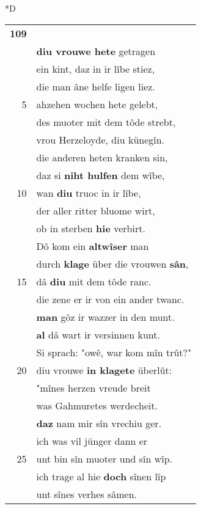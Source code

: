\documentclass[8pt,a4paper,notitlepage]{article}
\begin{document}
\begin{table}[ht]
\begin{minipage}[t]{0.5\linewidth}
\small
\begin{center}*D
\end{center}
\begin{tabular}{rl}
\textbf{109} & \textbf{\begin{large}D\end{large}ie} muosen wol von \textbf{schulden} klagen.\\ 
 & \textbf{diu vrouwe hete} getragen\\ 
 & ein kint, daz in ir lîbe stiez,\\ 
 & die man âne helfe ligen liez.\\ 
5 & ahzehen wochen hete gelebt,\\ 
 & des muoter mit dem tôde strebt,\\ 
 & vrou Herzeloyde, diu künegîn.\\ 
 & die anderen heten kranken sin,\\ 
 & daz si \textbf{niht hulfen} dem wîbe,\\ 
10 & wan \textbf{diu} truoc in ir lîbe,\\ 
 & der aller ritter bluome wirt,\\ 
 & ob in sterben \textbf{hie} verbirt.\\ 
 & Dô kom ein \textbf{altwîser} man\\ 
 & durch \textbf{klage} über die vrouwen \textbf{sân},\\ 
15 & dâ \textbf{diu} mit dem tôde ranc.\\ 
 & die zene er ir von ein ander twanc.\\ 
 & \textbf{man} gôz ir wazzer in den munt.\\ 
 & \textbf{al} dâ wart ir versinnen kunt.\\ 
 & Si sprach: "owê, war kom mîn trût?"\\ 
20 & diu vrouwe \textbf{in klagete} überlût:\\ 
 & "mînes herzen vreude breit\\ 
 & was Gahmuretes werdecheit.\\ 
 & \textbf{daz} nam mir sîn vrechiu ger.\\ 
 & ich was vil jünger dann er\\ 
25 & unt bin sîn muoter und sîn wîp.\\ 
 & ich trage al hie \textbf{doch} sînen lîp\\ 
 & unt sînes verhes sâmen.\\ 

\end{tabular}
\end{minipage}
\end{table}
\end{document}
